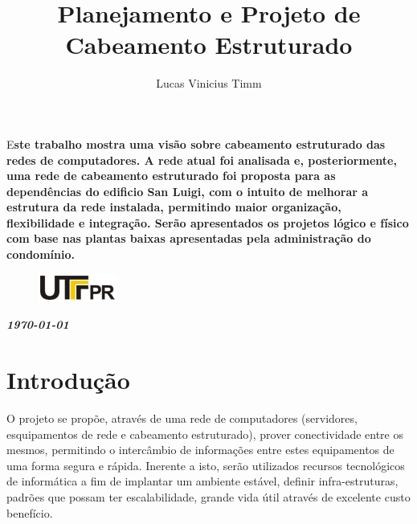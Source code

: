 \documentclass[	DIV=calc,%
							paper=a4,%
							fontsize=12pt,%
							onecolumn]{scrartcl}	 					%
\title{Planejamento e Projeto de Cabeamento Estruturado}					%
\author{Lucas Vinicius Timm}  	%
\date{}																				%
\newcommand{\initial}[1]{%
     \lettrine[lines=3,lhang=0.3,nindent=0em]{
     				\color{DarkGoldenrod}
     				{\textsf{#1}}}{}}
\begin{document}
\maketitle
\thispagestyle{fancy} 	
\thispagestyle{empty}		%




\initial{E}\textbf{ste trabalho mostra uma visão sobre cabeamento estruturado das redes de
computadores. A rede atual foi analisada e, posteriormente, uma rede de cabeamento
estruturado foi proposta para as dependências do edificio San Luigi, com o intuito de
melhorar a estrutura da rede instalada, permitindo maior organização, flexibilidade e
integração. Serão apresentados os projetos lógico e físico com base nas plantas baixas apresentadas pela administração do condomínio.}

\begin{figure}
	\centering
	\includegraphics{utfpr}
\end{figure}

\vspace{3cm}
\centerline{\textit{\textbf{\today}}}

\clearpage
    \renewcommand*\listfigurename{Lista de figuras}
\listoffigures

\renewcommand*\listtablename{Lista de tabelas}
\listoftables




\clearpage
\renewcommand{\contentsname}{Sumário}
\tableofcontents
\clearpage

\section{Introdução}
{\raggedright O projeto se propõe, através de uma rede de computadores (servidores, esquipamentos de rede e cabeamento estruturado), prover conectividade entre os mesmos, permitindo o intercâmbio de informações entre estes equipamentos de uma forma segura e rápida. Inerente a isto, serão utilizados recursos tecnológicos de informática a fim de implantar um ambiente estável, definir infra-estruturas, padrões que possam ter escalabilidade, grande vida útil através de excelente custo benefício.}
\end{document}
